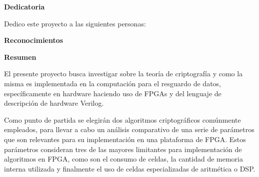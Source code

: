 \begin{center}\huge{\textbf{Dedicatoria}}\end{center}

Dedico este proyecto a las siguientes personas:
\blinditemize
\cleardoublepage

\begin{center}\huge{\textbf{Reconocimientos}}\end{center}
\blindtext
\cleardoublepage

\begin{center}\huge{\textbf{Resumen}}\end{center}


El presente proyecto busca investigar sobre la teoría de criptografía y como la misma es implementada en la computación para el resguardo de datos, específicamente en hardware haciendo uso de FPGAs y del lenguaje de descripción de hardware Verilog. 

Como punto de partida se elegirán dos algoritmos criptográficos comúnmente empleados, para llevar a cabo un análisis comparativo de una serie de parámetros que son relevantes para su implementación en una plataforma de FPGA. Estos parámetros consideran tres de las mayores limitantes para implementación de algoritmos en FPGA, como son el consumo de celdas, la cantidad de memoria interna utilizada y finalmente el uso de celdas especializadas de aritmética o DSP.
